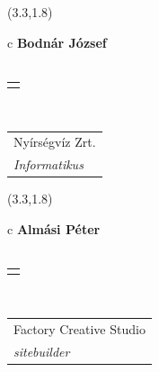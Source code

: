 \documentclass[11pt]{article}
\begin{document}
\makebox(3.3,1.8){
  \renewcommand\arraystretch{1.3}
  \begin{tabular}[c]{c}
    \hspace{8.5mm}
    \LARGE\bf{ Bodnár József }\\
    \hspace{8.5mm}
    \Large{  }\\
    \renewcommand\arraystretch{3}
    \begin{tabular}[c]{c}
      \centering
      \fontfamily{phv}\selectfont{
        \textbf{
          \textsc{
            \scriptsize{
            \color{Dark}{ Ismerkedő }\color{Bright}{ Webmester }\color{Bright}{ Sminkmester }\color{Bright}{ Programozó }
            }
          }
        }
      }
    \end{tabular}
    \\
    \renewcommand\arraystretch{1}
    \begin{tabular}{p{3.3in}}
      \hspace{.7cm}Nyírségvíz Zrt.\\
      \hspace{.7cm}\emph{ Informatikus }\\
    \end{tabular}
  \end{tabular}
}

\makebox(3.3,1.8){
  \renewcommand\arraystretch{1.3}
  \begin{tabular}[c]{c}
    \hspace{8.5mm}
    \LARGE\bf{ Almási Péter }\\
    \hspace{8.5mm}
    \Large{  }\\
    \renewcommand\arraystretch{3}
    \begin{tabular}[c]{c}
      \centering
      \fontfamily{phv}\selectfont{
        \textbf{
          \textsc{
            \scriptsize{
            \color{Dark}{ Ismerkedő }\color{Bright}{ Webmester }\color{Bright}{ Sminkmester }\color{Bright}{ Programozó }
            }
          }
        }
      }
    \end{tabular}
    \\
    \renewcommand\arraystretch{1}
    \begin{tabular}{p{3.3in}}
      \hspace{.7cm}Factory Creative Studio\\
      \hspace{.7cm}\emph{ sitebuilder }\\
    \end{tabular}
  \end{tabular}
}
\end{document}
